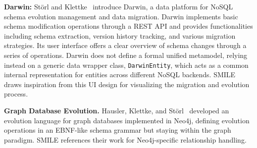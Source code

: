 \textbf{Darwin:} Störl and Klettke~\cite{storl2022darwin} introduce Darwin, a data platform for NoSQL schema evolution management and data migration. Darwin implements basic schema modification operations through a REST API and provides functionalities including schema extraction, version history tracking, and various migration strategies. Its user interface offers a clear overview of schema changes through a series of operations. Darwin does not define a formal unified metamodel, relying instead on a generic data wrapper class, \texttt{DarwinEntity}, which acts as a common internal
representation for entities across different NoSQL backends. SMILE  draws inspiration from this UI design for visualizing the migration and evolution process.


\textbf{Graph Database Evolution.}
Hausler, Klettke, and Störl~\cite{hausler2023language} developed an evolution
  language for graph databases implemented in Neo4j, defining evolution operations
  in an EBNF-like schema grammar but staying within the graph paradigm.
  SMILE references their work for Neo4j-specific relationship handling.



